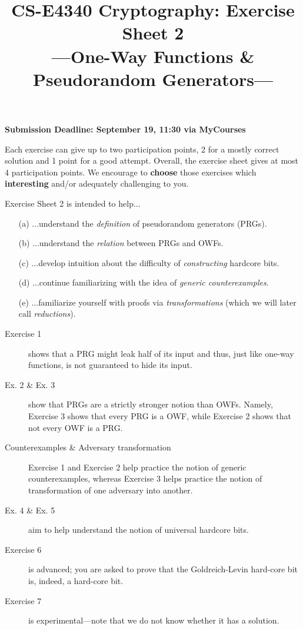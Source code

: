 \documentclass[envcountsame,runningheads,notitlepage]{../llncs}
\title{CS-E4340 Cryptography: Exercise Sheet 2\\[0.5\baselineskip]
\large ---One-Way Functions \& Pseudorandom Generators---}
\author{}\institute{}
\theoremstyle{definition}
\begin{document}
\maketitle

\noindent
\textbf{Submission Deadline: September 19, 11:30 via MyCourses}

\medskip
\noindent
Each exercise can give up to two participation points, 2 for a mostly correct solution and 1 point for a good attempt. Overall, the exercise sheet gives at most 4 participation points. We encourage to \textbf{choose} those exercises which \textbf{interesting} and/or adequately challenging to you.

\medskip
\noindent
Exercise Sheet 2 is intended to help...
\begin{itemize}
\item[(a)] ...understand the \emph{definition} of pseudorandom generators (PRGs).
\item[(b)] ...understand the \emph{relation} between PRGs and OWFs.
\item[(c)] ...develop intuition about the difficulty of \emph{constructing} hardcore bits.
\item[(d)] ...continue familiarizing with the idea of \emph{generic counterexamples}.
\item[(e)] ...familiarize yourself with proofs via \emph{transformations} (which we will later call \emph{reductions}).
\end{itemize}

\begin{description}
\item[Exercise 1] shows that a PRG might leak half of its input and thus, just like one-way functions, is not guaranteed to hide its input. \item[Ex. 2 \& Ex. 3] show that PRGs are a strictly stronger notion than OWFs. Namely, Exercise 3 shows that every PRG is a OWF, while Exercise 2 shows that not every OWF is a PRG. 
\item[Counterexamples \& Adversary transformation] Exercise 1 and Exercise 2 help practice the notion of generic counterexamples, whereas Exercise 3 helps practice the notion of transformation of one adversary into another.
\item[Ex. 4 \& Ex. 5] aim to help understand the notion of universal hardcore bits. 
\item[Exercise 6] is advanced; you are asked to prove that the Goldreich-Levin hard-core bit is, indeed, a hard-core bit. 
\item[Exercise 7] is experimental---note that we do not know whether it has a solution.
\end{description}
\end{document}
